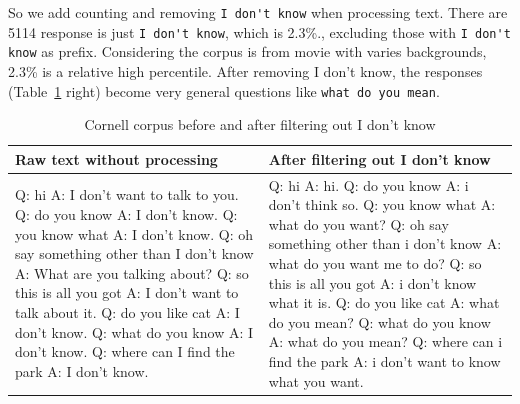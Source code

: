 \documentclass{article}
\begin{document}
So we add counting and removing \verb+I don't know+ when processing text.
There are 5114 response is just \verb+I don't know+, which is 2.3\%., excluding those with \verb+I don't know+ as prefix.
Considering the corpus is from movie with varies backgrounds, 2.3\% is a relative high percentile.
After removing I don't know, the responses (Table~\ref{table:cornell-idk} right) become very general questions like \verb+what do you mean+.

\begin{table}[h]
    \caption{Cornell corpus before and after filtering out I don't know}
    \label{table:cornell-idk}
    \centering
\begin{tabular}{p{70mm}|p{70mm}}
  \toprule
  Raw text without processing & After filtering out I don't know \\
  \hline
  Q: hi \newline
A: I don't want to talk to you. \newline
Q: do you know \newline
A: I don't know. \newline
Q: you know what \newline
A: I don't know. \newline
Q: oh say something other than I don't know \newline
A: What are you talking about? \newline
Q: so this is all you got \newline
A: I don't want to talk about it. \newline
Q: do you like cat \newline
A: I don't know. \newline
Q: what do you know \newline
A: I don't know. \newline
Q: where can I find the park \newline
A: I don't know. \newline
  &
Q: hi \newline
A: hi. \newline
Q: do you know \newline
A: i don't think so. \newline
Q: you know what \newline
A: what do you want? \newline
Q: oh say something other than i don't know \newline
A: what do you want me to do? \newline
Q: so this is all you got \newline
A: i don't know what it is. \newline
Q: do you like cat \newline
A: what do you mean? \newline
Q: what do you know \newline
A: what do you mean? \newline
Q: where can i find the park \newline
A: i don't want to know what you want. \newline
  \\
  \bottomrule
\end{tabular}
\end{table}
\end{document}
